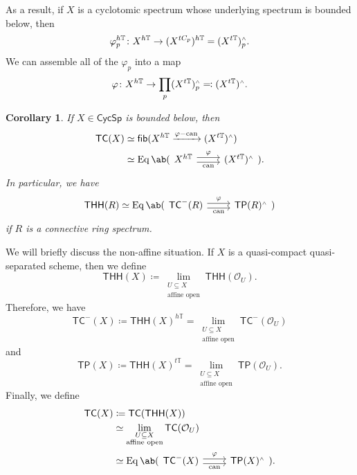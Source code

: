 \documentclass[10pt, oneside]{memoir}
\newtheorem{cor}[thm]{Corollary}
\theoremstyle{definition}
\theoremstyle{remark}
\theoremstyle{plain}
\theoremstyle{definition}
\theoremstyle{remark}
\newcommand{\mc}[1]{\mathcal{#1}}
\newcommand{\T}{\mathbb{T}}
\newcommand{\on}[1]{\operatorname{#1}}
\newcommand{\ms}[1]{\mathsf{#1}}
\newcommand{\1}{\mathbf{1}}
\newcommand{\2}{\mathbf{2}}
\newcommand{\3}{\mathbf{3}}
\newcommand{\THH}{\ms{THH}}
\newcommand{\TC}{\ms{TC}}
\newcommand{\TP}{\ms{TP}}
\newcommand{\sw}{\mathsmaller{\wedge}}
\begin{document}
As a result, if \(X \) is a cyclotomic spectrum whose underlying spectrum is bounded below, then
\[ \varphi_p^{h\T} \colon X^{h\T} \to (X^{tC_p})^{h\T} = (X^{t\T})_p^{\sw}. \]
We can assemble all of the \(\varphi_p \) into a map
\[ \varphi \colon X^{h\T} \to \prod_p (X^{t\T})^{\sw}_p \eqqcolon (X^{t\T})^{\sw}. \]

\begin{cor}
    If \(X \in \ms{CycSp} \) is bounded below, then
    \begin{align*}
        \TC(X) &\simeq \ms{fib} (X^{h\T} \xrightarrow{\varphi-\on{can}} (X^{t\T})^{\sw}) \\
        &\simeq \on{Eq} \ab(\begin{tikzcd}[ampersand replacement=\&]
            X^{h\T} \ar[shift left=1]{r}{\varphi} \ar[shift right=1]{r}[swap]{\on{can}} \& (X^{t\T})^{\sw}
        \end{tikzcd}).
    \end{align*}
    In particular, we have
    \[ \THH(R) \simeq \on{Eq} \ab(\begin{tikzcd}[ampersand replacement=\&]
        \TC^-(R) \ar[shift left=1]{r}{\varphi} \ar[shift right=1]{r}[swap]{\on{can}} \& \TP(R)^{\sw}
    \end{tikzcd}) \]
    if \(R \) is a connective ring spectrum.
\end{cor}

We will briefly discuss the non-affine situation. If \(X \) is a quasi-compact quasi-separated scheme, then we define
\[ \THH(X) \coloneqq \lim_{\substack{U \subseteq X \\ \text{affine open}}} \THH(\mc{O}_U). \]
Therefore, we have
\[ \TC^-(X) \coloneqq \THH(X)^{h\T} = \lim_{\substack{U \subseteq X \\ \text{affine open}}} \TC^-(\mc{O}_U) \]
and
\[ \TP(X) \coloneqq \THH(X)^{t\T} = \lim_{\substack{U \subseteq X \\ \text{affine open}}} \TP(\mc{O}_U). \]
Finally, we define
\begin{align*}
    \TC(X) &\coloneqq \TC(\THH(X))\\ 
    &\simeq \lim_{\substack{U \subseteq X \\ \text{affine open}}} \TC(\mc{O}_U) \\
    &\simeq \on{Eq} \ab(\begin{tikzcd}[ampersand replacement=\&]
        \TC^-(X) \ar[shift left=1]{r}{\varphi} \ar[shift right=1]{r}[swap]{\on{can}} \& \TP(X)^{\sw}
    \end{tikzcd}).
\end{align*}
\end{document}
